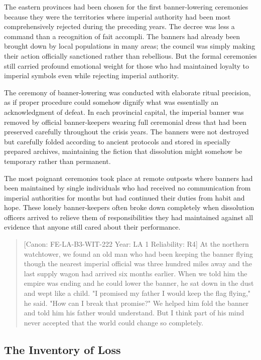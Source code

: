 The eastern provinces had been chosen for the first banner-lowering
ceremonies because they were the territories where imperial authority
had been most comprehensively rejected during the preceding years. The
decree was less a command than a recognition of fait accompli. The
banners had already been brought down by local populations in many
areas; the council was simply making their action officially sanctioned
rather than rebellious. But the formal ceremonies still carried profound
emotional weight for those who had maintained loyalty to imperial
symbols even while rejecting imperial authority.

The ceremony of banner-lowering was conducted with elaborate ritual
precision, as if proper procedure could somehow dignify what was
essentially an acknowledgment of defeat. In each provincial capital, the
imperial banner was removed by official banner-keepers wearing full
ceremonial dress that had been preserved carefully throughout the crisis
years. The banners were not destroyed but carefully folded according to
ancient protocols and stored in specially prepared archives, maintaining
the fiction that dissolution might somehow be temporary rather than
permanent.

The most poignant ceremonies took place at remote outposts where banners
had been maintained by single individuals who had received no
communication from imperial authorities for months but had continued
their duties from habit and hope. These lonely banner-keepers often
broke down completely when dissolution officers arrived to relieve them
of responsibilities they had maintained against all evidence that anyone
still cared about their performance.

\begin{quote}
{[}Canon: FE-LA-B3-WIT-222 \textbar{} Year: LA 1 \textbar{} Reliability:
R4{]} At the northern watchtower, we found an old man who had been
keeping the banner flying though the nearest imperial official was three
hundred miles away and the last supply wagon had arrived six months
earlier. When we told him the empire was ending and he could lower the
banner, he sat down in the dust and wept like a child. "I promised my
father I would keep the flag flying," he said. "How can I break that
promise?" We helped him fold the banner and told him his father would
understand. But I think part of his mind never accepted that the world
could change so completely.
\end{quote}

\subsection{The Inventory of Loss}\label{the-inventory-of-loss}

